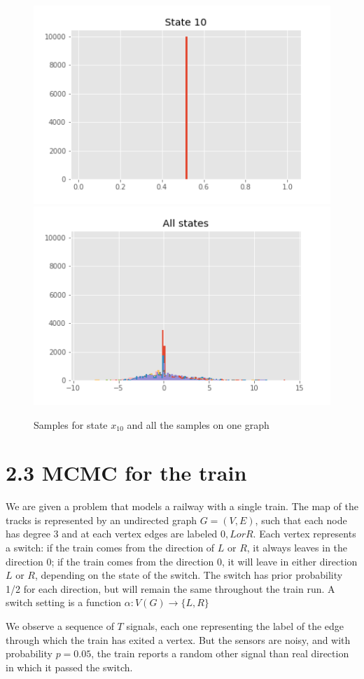 \documentclass[]{article}
\begin{document}
\begin{figure}[H]
	\begin{center}
	
		\includegraphics[width=.4\textwidth]{task2/figures/T_2_2/Q2/plt_x10.png}
		\includegraphics[width=.4\textwidth]{task2/figures/T_2_2/Q2/plt_x_all.png}
		
		\caption*{Samples for state $x_10$ and all the samples on one graph}

	\end{center}
\end{figure}


\newpage



\section*{2.3 MCMC for the train}
We are given a problem that models a railway with a single train. The map of the tracks is represented by an undirected graph $G=(V,E)$, such that each node has degree 3 and at each vertex edges are labeled $0, L or R$. Each vertex represents a switch: if the train comes from the direction of $L$ or $R$, it always leaves in the direction 0; if the train comes from the direction $0$, it will leave in either direction $L$ or $R$, depending on the state of the switch. The switch has prior probability 1/2 for each direction, but will remain the same throughout the train run. A switch setting is a function $\alpha : V(G) \rightarrow \{L,R\}$

We observe a sequence of $T$ signals, each one representing the label of the edge through which the train has exited a vertex. But the sensors are noisy, and with probability $p = 0.05$, the train reports a random other signal than real direction in which it passed the switch. 
\end{document}
